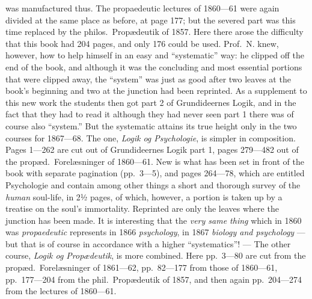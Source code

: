 \documentclass[12pt,a4paper]{book}
\begin{document}
was manufactured thus. The propaedeutic lectures of 1860---61 were again divided
at the same place as before, at page 177; but the severed part was this time
replaced by the philos.\ Propædeutik of 1857. Here there arose the difficulty
that this book had 204 pages, and only 176 could be used. Prof.\ N. knew,
however, how to help himself in an easy and ``systematic'' way: he clipped off
the end of the book, and although it was the concluding and most essential
portions that were clipped away, the ``system'' was just as good after two leaves
at the book's beginning and two at the junction had been reprinted. As a
supplement to this new work the students then got part 2 of Grundideernes Logik,
and in the fact that they had to read it although they had never seen part 1
there was of course also ``system.'' But the systematic attains its true height
only in the two courses for 1867---68. The one, \emph{Logik og Psychologie}, is
simpler in composition.
Pages 1---262 are cut out of Grundideernes Logik part 1, pages 279---482 out of
the propæd.\ Forelæsninger of 1860---61. New is what has been set in front of the
book with separate pagination (pp.\ 3---5), and pages 264---78, which are
entitled Psychologie and contain among other things a short and thorough survey
of the \emph{human}
soul-life, in 2½ pages, of which, however, a portion is taken up by a treatise on
the soul's immortality. Reprinted are only the leaves where the junction has been
made. It is interesting that the \emph{very same thing} which in 1860 was
\emph{propaedeutic} represents in 1866 \emph{psychology}, in 1867 \emph{biology
and psychology}
--- but that is of course in accordance with a higher ``systematics''! --- The
other course, \emph{Logik og Propædeutik}, is more combined. Here pp.\ 3---80 are
cut from the propæd.\ Forelæsninger of 1861---62, pp.\ 82---177 from those of
1860---61, pp.\ 177---204 from the phil.\ Propædeutik of 1857, and then again pp.\
204---274 from the lectures of 1860---61.
\end{document}
